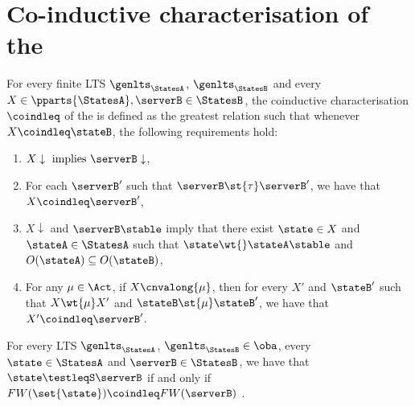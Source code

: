 \section{Co-inductive characterisation of the \mustpreorder}
\label{sec:coinductive-char}


\begin{definition}
\label{def:coinductive-char}
For every finite LTS $\genlts_\StatesA$, $\genlts_\StatesB$ and every
$X \in \pparts{\StatesA}, \serverB \in \StatesB$,
the coinductive characterisation $\coindleq$ of the \mustpreorder is defined as the greatest relation
such that whenever $X \coindleq \stateB$, the following requirements hold:
\begin{enumerate}
\item $X \downarrow \text{ implies } \serverB \downarrow$,
\item\label{pt:coind-tau-serverB} For each $\serverB'$ such that $\serverB \st{\tau} \serverB'$, we have that $X \coindleq \serverB'$,

\item\label{pt:coind-acceptance-sets}
  $X \downarrow$ and $\serverB \stable$ imply that there exist
  $\state \in X$ and $\stateA \in \StatesA$ such that
  $\state \wt{} \stateA \stable$ and $O(\stateA) \subseteq O(\stateB)$,

\item\label{pt:coind-continuations-mu} For any $\mu \in \Act$,
  if $X \cnvalong{\mu}$,
  then for every  $X'$ and $\stateB'$
  such that $X \wt{\mu} X'$ and $\stateB \st{\mu} \stateB'$,
  we have that
  $X' \coindleq \serverB'$.
\end{enumerate}
\end{definition}


\begin{theorem}
\label{thm:coinductive-char-equiv}
For every LTS $\genlts_\StatesA$, $\genlts_\StatesB \in \oba$, every
$\state \in \StatesA$ and $\serverB \in \StatesB$, we have that
$\state \testleqS \serverB$ if and only if $FW(\set{\state}) \coindleq FW(\serverB)$ .
\end{theorem}

\newcommand{\Rfw}{\mathrel{\R_{\textsf{fw}}}}
\newcommand{\Rbase}{\mathrel{\R_{\textsf{base}}}}


